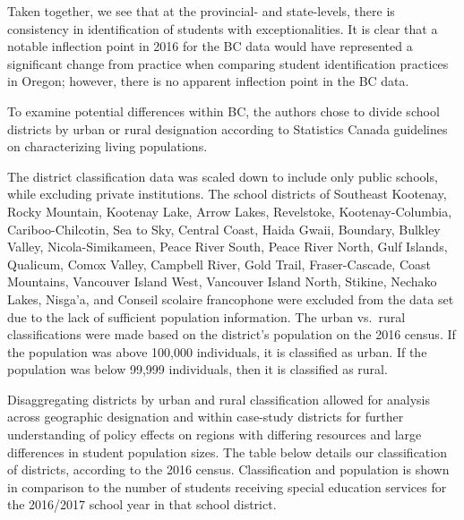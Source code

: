 \documentclass[
  english,
  man,floatsintext]{apa6}
\begin{document}
Taken together, we see that at the provincial- and state-levels, there is consistency in identification of students with exceptionalities. It is clear that a notable inflection point in 2016 for the BC data would have represented a significant change from practice when comparing student identification practices in Oregon; however, there is no apparent inflection point in the BC data.

To examine potential differences within BC, the authors chose to divide school districts by urban or rural designation according to Statistics Canada guidelines on characterizing living populations.

The district classification data was scaled down to include only public schools, while excluding private institutions. The school districts of Southeast Kootenay, Rocky Mountain, Kootenay Lake, Arrow Lakes, Revelstoke, Kootenay-Columbia, Cariboo-Chilcotin, Sea to Sky, Central Coast, Haida Gwaii, Boundary, Bulkley Valley, Nicola-Simikameen, Peace River South, Peace River North, Gulf Islands, Qualicum, Comox Valley, Campbell River, Gold Trail, Fraser-Cascade, Coast Mountains, Vancouver Island West, Vancouver Island North, Stikine, Nechako Lakes, Nisga'a, and Conseil scolaire francophone were excluded from the data set due to the lack of sufficient population information. The urban vs.~rural classifications were made based on the district's population on the 2016 census. If the population was above 100,000 individuals, it is classified as urban. If the population was below 99,999 individuals, then it is classified as rural.

Disaggregating districts by urban and rural classification allowed for analysis across geographic designation and within case-study districts for further understanding of policy effects on regions with differing resources and large differences in student population sizes. The table below details our classification of districts, according to the 2016 census. Classification and population is shown in comparison to the number of students receiving special education services for the 2016/2017 school year in that school district.
\end{document}
